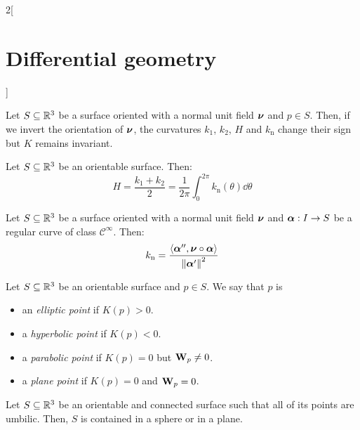 \documentclass[../../../main.tex]{subfiles}
\begin{document}
\begin{multicols}{2}[\section{Differential geometry}]
\begin{corollary}
  \end{corollary}
  \begin{proposition}
    Let $S\subseteq\mathbb{R}^3$ be a surface oriented with a normal unit field $\boldsymbol{\mathrm{\nu}}$ and $p\in S$. Then, if we invert the orientation of $\boldsymbol{\mathrm{\nu}}$, the curvatures $k_1$, $k_2$, $H$ and $k_\text{n}$ change their sign but $K$ remains invariant.
  \end{proposition}
  \begin{proposition}
    Let $S\subseteq\mathbb{R}^3$ be an orientable surface. Then: $$H=\frac{k_1+k_2}{2}=\frac{1}{2\pi}\int_0^{2\pi}k_\text{n}(\theta)\dd\theta$$
  \end{proposition}
  \begin{proposition}
    Let $S\subseteq\mathbb{R}^3$ be a surface oriented with a normal unit field $\boldsymbol{\mathrm{\nu}}$ and $\boldsymbol{\mathrm{\alpha}}:I\rightarrow S$ be a regular curve of class $\mathcal{C}^\infty$. Then: $$k_\text{n}=\frac{\langle\boldsymbol{\mathrm{\alpha}}'',\boldsymbol{\mathrm{\nu}}\circ\boldsymbol{\mathrm{\alpha}}\rangle}{{\|\boldsymbol{\mathrm{\alpha}}'\|}^2}$$
  \end{proposition}
  \begin{definition}
    Let $S\subseteq\mathbb{R}^3$ be an orientable surface and $p\in S$. We say that $p$ is
    \begin{itemize}
      \item an \emph{elliptic point} if $K(p)>0$.
      \item a \emph{hyperbolic point} if $K(p)<0$.
      \item a \emph{parabolic point} if $K(p)=0$ but $\boldsymbol{\mathrm{W}}_p\ne0$.
      \item a \emph{plane point} if $K(p)=0$ and $\boldsymbol{\mathrm{W}}_p=0$.
    \end{itemize}
  \end{definition}
  \begin{proposition}
    Let $S\subseteq\mathbb{R}^3$ be an orientable and connected surface such that all of its points are umbilic. Then, $S$ is contained in a sphere or in a plane.
  \end{proposition}

\end{multicols}
\end{document}
